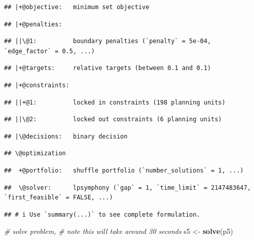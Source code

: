 \documentclass[12pt,]{book}
\newenvironment{Shaded}{\begin{snugshade}}{\end{snugshade}}
\newcommand{\CommentTok}[1]{\textcolor[rgb]{0.56,0.35,0.01}{\textit{#1}}}
\newcommand{\KeywordTok}[1]{\textcolor[rgb]{0.13,0.29,0.53}{\textbf{#1}}}
\newcommand{\NormalTok}[1]{#1}
\newcommand{\StringTok}[1]{\textcolor[rgb]{0.31,0.60,0.02}{#1}}
\begin{document}
\begin{verbatim}
## |+@objective:   minimum set objective
\end{verbatim}

\begin{verbatim}
## |+@penalties:
\end{verbatim}

\begin{verbatim}
## ||\@1:          boundary penalties (`penalty` = 5e-04, `edge_factor` = 0.5, ...)
\end{verbatim}

\begin{verbatim}
## |+@targets:     relative targets (between 0.1 and 0.1)
\end{verbatim}

\begin{verbatim}
## |+@constraints:
\end{verbatim}

\begin{verbatim}
## ||+@1:          locked in constraints (198 planning units)
\end{verbatim}

\begin{verbatim}
## ||\@2:          locked out constraints (6 planning units)
\end{verbatim}

\begin{verbatim}
## |\@decisions:   binary decision
\end{verbatim}

\begin{verbatim}
## \@optimization
\end{verbatim}

\begin{verbatim}
##  +@portfolio:   shuffle portfolio (`number_solutions` = 1, ...)
\end{verbatim}

\begin{verbatim}
##  \@solver:      lpsymphony (`gap` = 1, `time_limit` = 2147483647, `first_feasible` = FALSE, ...)
\end{verbatim}

\begin{verbatim}
## # i Use `summary(...)` to see complete formulation.
\end{verbatim}

\begin{Shaded}
\begin{Highlighting}[]
\CommentTok{# solve problem,}
\CommentTok{# note this will take around 30 seconds}
\NormalTok{s5 <-}\StringTok{ }\KeywordTok{solve}\NormalTok{(p5)}
\end{Highlighting}
\end{Shaded}
\end{document}

